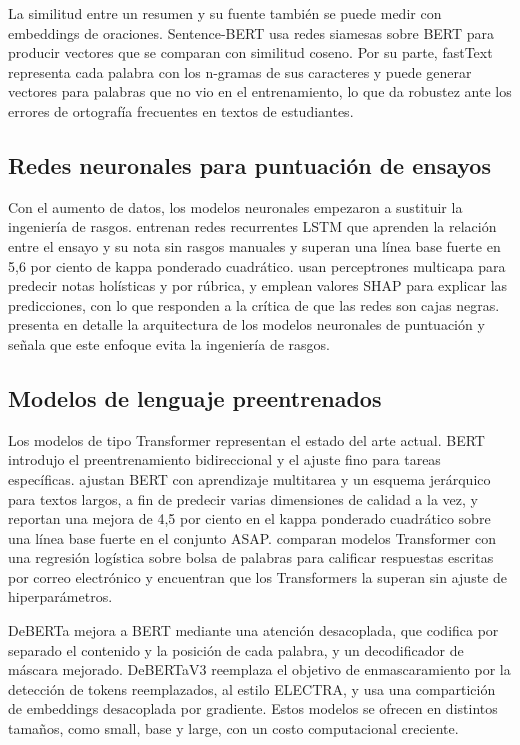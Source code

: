 \documentclass[11pt,a4paper]{article}
\begin{document}
La similitud entre un resumen y su fuente también se puede medir con embeddings de oraciones. Sentence-BERT \citep{reimers2019} usa redes siamesas sobre BERT para producir vectores que se comparan con similitud coseno. Por su parte, fastText \citep{bojanowski2017} representa cada palabra con los n-gramas de sus caracteres y puede generar vectores para palabras que no vio en el entrenamiento, lo que da robustez ante los errores de ortografía frecuentes en textos de estudiantes.

\subsection{Redes neuronales para puntuación de ensayos}

Con el aumento de datos, los modelos neuronales empezaron a sustituir la ingeniería de rasgos. \citet{taghipour2016} entrenan redes recurrentes LSTM \citep{hochreiter1997} que aprenden la relación entre el ensayo y su nota sin rasgos manuales y superan una línea base fuerte en 5,6 por ciento de kappa ponderado cuadrático. \citet{kumar2020} usan perceptrones multicapa para predecir notas holísticas y por rúbrica, y emplean valores SHAP para explicar las predicciones, con lo que responden a la crítica de que las redes son cajas negras. \citet{uto2021} presenta en detalle la arquitectura de los modelos neuronales de puntuación y señala que este enfoque evita la ingeniería de rasgos.

\subsection{Modelos de lenguaje preentrenados}

Los modelos de tipo Transformer representan el estado del arte actual. BERT \citep{devlin2019} introdujo el preentrenamiento bidireccional y el ajuste fino para tareas específicas. \citet{xue2021} ajustan BERT con aprendizaje multitarea y un esquema jerárquico para textos largos, a fin de predecir varias dimensiones de calidad a la vez, y reportan una mejora de 4,5 por ciento en el kappa ponderado cuadrático sobre una línea base fuerte en el conjunto ASAP. \citet{ludwig2021} comparan modelos Transformer con una regresión logística sobre bolsa de palabras para calificar respuestas escritas por correo electrónico y encuentran que los Transformers la superan sin ajuste de hiperparámetros.

DeBERTa \citep{he2021} mejora a BERT mediante una atención desacoplada, que codifica por separado el contenido y la posición de cada palabra, y un decodificador de máscara mejorado. DeBERTaV3 \citep{he2023} reemplaza el objetivo de enmascaramiento por la detección de tokens reemplazados, al estilo ELECTRA, y usa una compartición de embeddings desacoplada por gradiente. Estos modelos se ofrecen en distintos tamaños, como small, base y large, con un costo computacional creciente.
\end{document}
